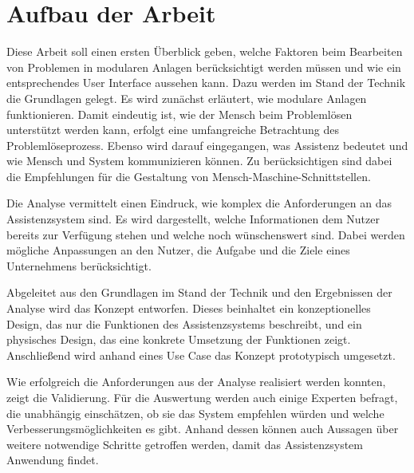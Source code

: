 \section{Aufbau der Arbeit}
Diese Arbeit soll einen ersten Überblick geben, welche Faktoren beim Bearbeiten von Problemen in modularen Anlagen berücksichtigt werden müssen und wie ein entsprechendes User Interface aussehen kann. Dazu werden im Stand der Technik die Grundlagen gelegt. Es wird zunächst erläutert, wie modulare Anlagen funktionieren. Damit eindeutig ist, wie der Mensch beim Problemlösen unterstützt werden kann, erfolgt eine umfangreiche Betrachtung des Problemlöseprozess. Ebenso wird darauf eingegangen, was Assistenz bedeutet und wie Mensch und System kommunizieren können. Zu berücksichtigen sind dabei die Empfehlungen für die Gestaltung von Mensch-Maschine-Schnittstellen.

Die Analyse vermittelt einen Eindruck, wie komplex die Anforderungen an das Assistenzsystem sind. Es wird dargestellt, welche Informationen dem Nutzer bereits zur Verfügung stehen und welche noch wünschenswert sind. Dabei werden mögliche Anpassungen an den Nutzer, die Aufgabe und die Ziele eines Unternehmens berücksichtigt.

Abgeleitet aus den Grundlagen im Stand der Technik und den Ergebnissen der Analyse wird das Konzept entworfen. Dieses beinhaltet ein konzeptionelles Design, das nur die Funktionen des Assistenzsystems beschreibt, und ein physisches Design, das eine konkrete Umsetzung der Funktionen zeigt. Anschließend wird anhand eines Use Case das Konzept prototypisch umgesetzt.

Wie erfolgreich die Anforderungen aus der Analyse realisiert werden konnten, zeigt die Validierung. Für die Auswertung werden auch einige Experten befragt, die unabhängig einschätzen, ob sie das System empfehlen würden und welche Verbesserungsmöglichkeiten es gibt. Anhand dessen können auch Aussagen über weitere notwendige Schritte getroffen werden, damit das Assistenzsystem Anwendung findet.